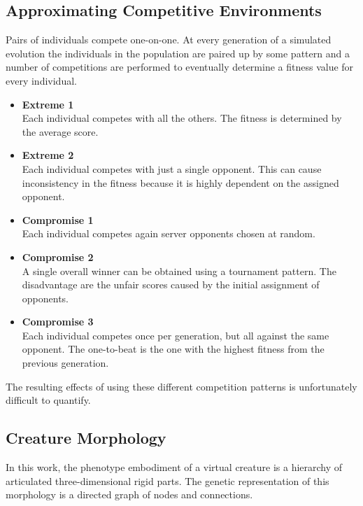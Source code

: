 \documentclass[../main.tex]{subfiles}
\begin{document}
\subsection{Approximating Competitive Environments}

Pairs of individuals compete one-on-one. At every generation of a simulated evolution the individuals in the population
are paired up by some pattern and a number of competitions are performed to eventually determine a fitness value for
every individual.

\begin{itemize}
	\item \textbf{Extreme 1} \\
	Each individual competes with all the others. The fitness is determined by the average score.
	\item \textbf{Extreme 2} \\
	Each individual competes with just a single opponent. This can cause inconsistency in the fitness because it is
	highly dependent on the assigned opponent.
	\item \textbf{Compromise 1} \\
	Each individual competes again server opponents chosen at random.
	\item \textbf{Compromise 2} \\
	A single overall winner can be obtained using a tournament pattern. The disadvantage are the unfair scores caused
	by the initial assignment of opponents.
	\item \textbf{Compromise 3} \\
	Each individual competes once per generation, but all against the same opponent. The one-to-beat is the one with
	the highest fitness from the previous generation.
\end{itemize}

The resulting effects of using these different competition patterns is unfortunately difficult to quantify.

\subsection{Creature Morphology}

In this work, the phenotype embodiment of a virtual creature is a hierarchy of articulated three-dimensional rigid
parts. The genetic representation of this morphology is a directed graph of nodes and connections.
\end{document}
